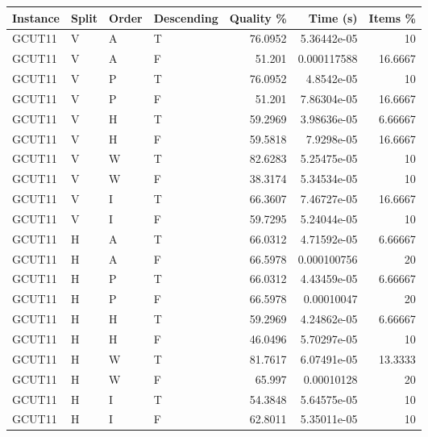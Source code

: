 \begin{tabular}{llllrrr}
    \hline
    Instance & Split & Order & Descending & Quality \% & Time (s)    & Items \% \\
    \hline
    GCUT11   & V     & A     & T          & 76.0952    & 5.36442e-05 & 10       \\
    GCUT11   & V     & A     & F          & 51.201     & 0.000117588 & 16.6667  \\
    GCUT11   & V     & P     & T          & 76.0952    & 4.8542e-05  & 10       \\
    GCUT11   & V     & P     & F          & 51.201     & 7.86304e-05 & 16.6667  \\
    GCUT11   & V     & H     & T          & 59.2969    & 3.98636e-05 & 6.66667  \\
    GCUT11   & V     & H     & F          & 59.5818    & 7.9298e-05  & 16.6667  \\
    GCUT11   & V     & W     & T          & 82.6283    & 5.25475e-05 & 10       \\
    GCUT11   & V     & W     & F          & 38.3174    & 5.34534e-05 & 10       \\
    GCUT11   & V     & I     & T          & 66.3607    & 7.46727e-05 & 16.6667  \\
    GCUT11   & V     & I     & F          & 59.7295    & 5.24044e-05 & 10       \\
    GCUT11   & H     & A     & T          & 66.0312    & 4.71592e-05 & 6.66667  \\
    GCUT11   & H     & A     & F          & 66.5978    & 0.000100756 & 20       \\
    GCUT11   & H     & P     & T          & 66.0312    & 4.43459e-05 & 6.66667  \\
    GCUT11   & H     & P     & F          & 66.5978    & 0.00010047  & 20       \\
    GCUT11   & H     & H     & T          & 59.2969    & 4.24862e-05 & 6.66667  \\
    GCUT11   & H     & H     & F          & 46.0496    & 5.70297e-05 & 10       \\
    GCUT11   & H     & W     & T          & 81.7617    & 6.07491e-05 & 13.3333  \\
    GCUT11   & H     & W     & F          & 65.997     & 0.00010128  & 20       \\
    GCUT11   & H     & I     & T          & 54.3848    & 5.64575e-05 & 10       \\
    GCUT11   & H     & I     & F          & 62.8011    & 5.35011e-05 & 10       \\

\end{tabular}
